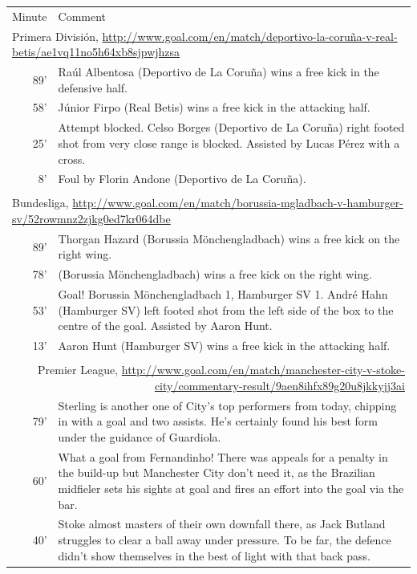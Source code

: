 \documentclass[10pt, a4paper]{UUThesisTemplate}
\begin{document}
\begin{table}\hspace{-1.7cm}\small
\begin{tabular}{r p{16.2cm}}
Minute & Comment\\
\multicolumn{2}{l}{Primera División, \url{http://www.goal.com/en/match/deportivo-la-coruña-v-real-betis/ae1vq11no5h64xb8sjpwjhzsa}}
\\\hline
89' &  Raúl Albentosa (Deportivo de La Coruña) wins a free kick in the defensive half.\\
58' &  Júnior Firpo (Real Betis) wins a free kick in the attacking half.\\
25' &  Attempt blocked. Celso Borges (Deportivo de La Coruña) right footed shot from very close range is blocked. Assisted by Lucas Pérez with a cross.\\
8' & Foul by Florin Andone (Deportivo de La Coruña).\\\\
\multicolumn{2}{l}{Bundesliga, \url{http://www.goal.com/en/match/borussia-mgladbach-v-hamburger-sv/52rowmnz2zjkg0ed7kr064dbe}}\\\hline
89' &  Thorgan Hazard (Borussia Mönchengladbach) wins a free kick on the right wing.\\
78' &  (Borussia Mönchengladbach) wins a free kick on the right wing.\\
53' & Goal! Borussia Mönchengladbach 1, Hamburger SV 1. André Hahn (Hamburger SV) left footed shot from the left side of the box to the centre of the goal. Assisted by Aaron Hunt.\\
13' & Aaron Hunt (Hamburger SV) wins a free kick in the attacking half.\\\\
\multicolumn{2}{p{18cm}}{Premier League, \url{http://www.goal.com/en/match/manchester-city-v-stoke-city/commentary-result/9aen8ihfx89g20u8jkkyjj3ai}}\\\hline
79' & Sterling is another one of City's top performers from today, chipping in with a goal and two assists. He's certainly found his best form under the guidance of Guardiola.\\
60' & What a goal from Fernandinho! There was appeals for a penalty in the build-up but Manchester City don't need it, as the Brazilian midfieler sets his sights at goal and fires an effort into the goal via the bar. \\
40' & Stoke almost masters of their own downfall there, as Jack Butland struggles to clear a ball away under pressure. To be far, the defence didn't show themselves in the best of light with that back pass.\\

\end{tabular}
\end{table}
\end{document}
